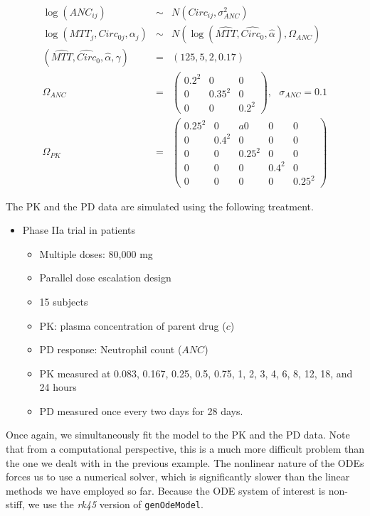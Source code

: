 \documentclass[11pt]{amsart}
\begin{document}
\begin{eqnarray*}
\log(ANC_{ij}) &\sim& N(Circ_{ij}, \sigma^2_{ANC}) \\
\log\left(MTT_j, Circ_{0j}, \alpha_j\right) &\sim& N\left(\log\left(\widehat{MTT}, \widehat{Circ_0}, \widehat{\alpha}\right), \Omega_{ANC}\right) \\
\left(\widehat{MTT}, \widehat{Circ}_0,\widehat{\alpha}, \gamma \right) &=& \left(125, 5, 2, 0.17\right) \\
\Omega_{ANC} &=& \left(\begin{array}{ccc} 0.2^2 & 0 & 0 \\ 0 & 0.35^2 & 0 \\ 0 & 0 & 0.2^2 \end{array}\right), \ \ \ \sigma_{ANC} = 0.1 \\
\Omega_{PK} &=& \left(\begin{array}{ccccc} 0.25^2 & 0 &a 0 & 0 & 0 \\ 0 & 0.4^2 & 0 & 0 & 0 \\
0 & 0 & 0.25^2 & 0 & 0 \\ 0 & 0 & 0 & 0.4^2 & 0 \\ 0 & 0 & 0 & 0 & 0.25^2  \end{array}\right)
\end{eqnarray*}

The PK and the PD data are simulated using the following treatment.
\begin{itemize}
  \item Phase IIa trial in patients
  \begin{itemize}
    \item Multiple doses: 80,000 mg
    \item Parallel dose escalation design
    \item 15 subjects
    \item PK: plasma concentration of parent drug ($c$)
    \item PD response: Neutrophil count ($ANC$)
    \item PK measured at 0.083, 0.167, 0.25, 0.5, 0.75, 1, 2, 3, 4, 6, 8, 12, 18, and 24 hours
    \item PD measured once every two days for 28 days.
  \end{itemize}
\end{itemize}

Once again, we simultaneously fit the model to the PK and the PD data. Note that from a computational perspective, this is a much more difficult problem than the one we dealt with in the previous example. The nonlinear nature of the ODEs forces us to use a numerical solver, which is significantly slower than the linear methods we have employed so far. Because the ODE system of interest is non-stiff, we use the \textit{rk45} version of \texttt{genOdeModel}.
\end{document}
